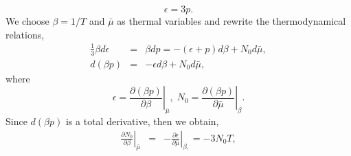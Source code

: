 \documentclass[aps,prd,showkeys,preprint,amsmath,amssymb,nofootinbib]{revtex4-1}
\begin{document}
\begin{equation}
\epsilon=3p.
\end{equation}
We choose $\beta=1/T$ and $\bar{\mu}$ as thermal variables and rewrite
the thermodynamical relations, 
\begin{eqnarray}
\frac{1}{3}\beta d\epsilon & = & \beta dp=-(\epsilon+p)d\beta+N_{0}d\bar{\mu},\nonumber \\
d\left(\beta p\right) & = & -\epsilon d\beta+N_{0}d\bar{\mu},\label{eq:thermal-temp-01}
\end{eqnarray}
where  
\begin{equation}
\epsilon=\left.\frac{\partial(\beta p)}{\partial\beta}\right|_{\bar{\mu}},\;N_{0}=\left.\frac{\partial(\beta p)}{\partial\bar{\mu}}\right|_{\beta}.
\end{equation}
Since $d(\beta p)$ is a total derivative, then we obtain, 
\begin{eqnarray}
\left.\frac{\partial N_{0}}{\partial\beta}\right|_{\bar{\mu}} & = & -\left.\frac{\partial\epsilon}{\partial\bar{\mu}}\right|_{\beta,}=-3N_{0}T,\nonumber \\
\label{eq:thermal-temp_02}
\end{eqnarray}
\end{document}
